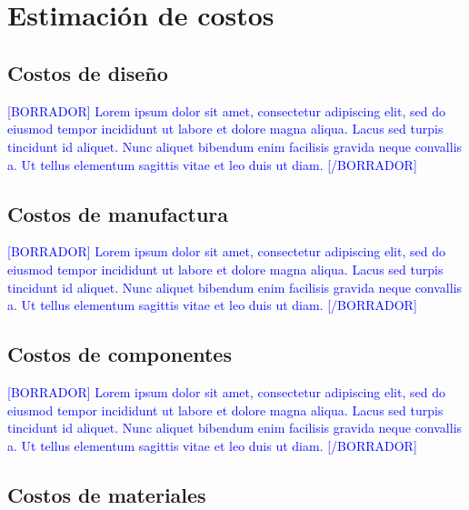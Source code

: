 
\pagestyle{myportland}
\doublespacing
\chapter[\quad\quad\quad\quad ----- Estimación de costos]{\\ Estimación de costos}
\thispagestyle{myportland}

\section{Costos de diseño}

\textcolor{blue}{[BORRADOR] Lorem ipsum dolor sit amet, consectetur adipiscing elit, sed do eiusmod tempor incididunt ut labore et dolore magna aliqua. Lacus sed turpis tincidunt id aliquet. Nunc aliquet bibendum enim facilisis gravida neque convallis a. Ut tellus elementum sagittis vitae et leo duis ut diam. [/BORRADOR]} 

\section{Costos de manufactura}

\textcolor{blue}{[BORRADOR] Lorem ipsum dolor sit amet, consectetur adipiscing elit, sed do eiusmod tempor incididunt ut labore et dolore magna aliqua. Lacus sed turpis tincidunt id aliquet. Nunc aliquet bibendum enim facilisis gravida neque convallis a. Ut tellus elementum sagittis vitae et leo duis ut diam. [/BORRADOR]} 

\section{Costos de componentes}

\textcolor{blue}{[BORRADOR] Lorem ipsum dolor sit amet, consectetur adipiscing elit, sed do eiusmod tempor incididunt ut labore et dolore magna aliqua. Lacus sed turpis tincidunt id aliquet. Nunc aliquet bibendum enim facilisis gravida neque convallis a. Ut tellus elementum sagittis vitae et leo duis ut diam. [/BORRADOR]} 

\section{Costos de materiales}

